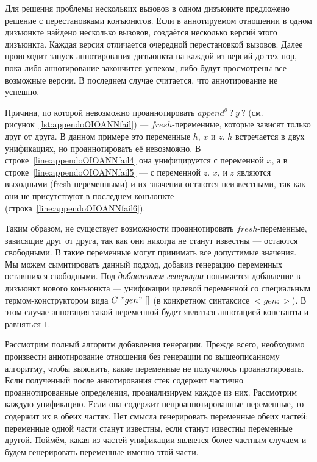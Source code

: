 Для решения проблемы нескольких вызовов в одном дизъюнкте предложено решение с перестановками конъюнктов.
Если в аннотируемом отношении в одном дизъюнкте найдено несколько вызовов, создаётся несколько версий этого дизъюнкта.
Каждая версия отличается очередной перестановкой вызовов.
Далее происходит запуск аннотирования дизъюнкта на каждой из версий до тех пор, пока либо аннотирование закончится успехом, либо будут просмотрены все возможные версии.
В последнем случае считается, что аннотирование не успешно.


Причина, по которой невозможно проаннотировать $append^o \ ? \ y \ ?$ (см. рисунок~\ref{lst:appendoOIOANNfail}) --- $fresh$-переменные, которые зависят только друг от друга.
В данном примере это переменные $h$, $x$ и $z$.
$h$ встречается в двух унификациях, но проаннотировать её невозможно.
В строке~\ref{line:appendoOIOANNfail4} она унифицируется с переменной $x$, а в строке~\ref{line:appendoOIOANNfail5} --- с переменной $z$.
$x$, и $z$ являются выходными (fresh-переменными) и их значения остаются неизвестными, так как они не присутствуют в последнем конъюнкте (строка~\ref{line:appendoOIOANNfail6}).

Таким образом, не существует возможности проаннотировать $fresh$-переменные, зависящие друг от друга, так как они никогда не станут известны --- остаются свободными.
В \miniKanren{} такие переменные могут принимать все допустимые значения.
Мы можем сымитировать данный подход, добавив генерацию переменных оставшихся свободными.
Под \emph{добавлением генерации} понимается добавление в дизъюнкт нового конъюнкта --- унификации целевой переменной со специальным термом-конструктором вида $C~"gen"~[]$ (в конкретном синтаксисе $<gen:>$).
В этом случае аннотация такой переменной будет являться аннотацией константы и равняться $1$.

Рассмотрим полный алгоритм добавления генерации.
Прежде всего, необходимо произвести аннотирование отношения без генерации по вышеописанному алгоритму, чтобы выяснить, какие переменные не получилось проаннотировать.
Если полученный после аннотирования стек содержит частично проаннотированные определения, проанализируем каждое из них.
Рассмотрим каждую унификацию.
Если она содержит непроаннотированные переменные, то содержит их в обеих частях.
Нет смысла генерировать переменные обеих частей: переменные одной части станут известны, если станут известны переменные другой.
Поймём, какая из частей унификации является более частным случаем и будем генерировать переменные именно этой части.

